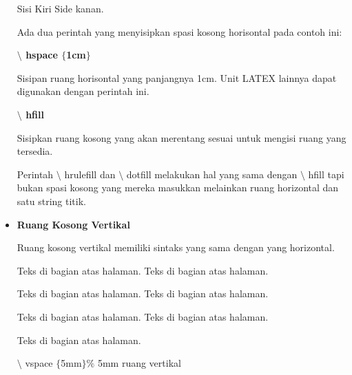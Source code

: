 \begin{itemize}
Sisi Kiri Side kanan.\par
\vspace{\baselineskip}
Ada dua perintah yang menyisipkan spasi kosong horisontal pada contoh ini:\par
\vspace{\baselineskip}
\hspace*{0.5in}\textbf{$\setminus$ hspace $ \{ $1cm$ \} $}\par
\vspace{\baselineskip}
Sisipan ruang horisontal yang panjangnya 1cm. Unit LATEX lainnya dapat digunakan dengan perintah ini.\par
\vspace{\baselineskip}
\hspace*{0.5in}\textbf{$\setminus$ hfill}\par
\vspace{\baselineskip}
Sisipkan ruang kosong yang akan merentang sesuai untuk mengisi ruang yang tersedia.\par
\vspace{\baselineskip}
Perintah $\setminus$ hrulefill dan $\setminus$ dotfill melakukan hal yang sama dengan $\setminus$ hfill tapi bukan spasi kosong yang mereka masukkan melainkan ruang horizontal dan satu string titik.\par
\vspace{\baselineskip}
\vspace{10pt}
	\item {\fontsize{14pt}{14pt}\selectfont \textbf{Ruang Kosong Vertikal}}\par
\vspace{\baselineskip}
Ruang kosong vertikal memiliki sintaks yang sama dengan yang horizontal.\par
\vspace{\baselineskip}
\hspace*{0.5in}Teks di bagian atas halaman. Teks di bagian atas halaman.\par

\hspace*{0.5in}Teks di bagian atas halaman. Teks di bagian atas halaman.\par

\hspace*{0.5in}Teks di bagian atas halaman. Teks di bagian atas halaman.\par

\hspace*{0.5in}Teks di bagian atas halaman.\par
\vspace{\baselineskip}
\hspace*{0.5in}$\setminus$ vspace $ \{ $5mm$ \} $$\%$ 5mm ruang vertikal\par


\end{itemize}
